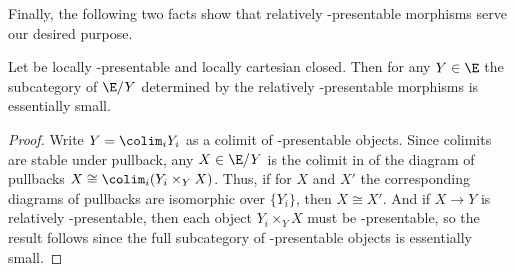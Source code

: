 Finally, the following two facts show that relatively \ka-presentable morphisms serve our desired purpose.

\begin{prop}\label{thm:relpres-small}
  Let \E be locally \ka-presentable and locally cartesian closed.
  Then for any $Y\in\E$ the subcategory of $\E/Y$ determined by the relatively \ka-presentable morphisms is essentially small.
\end{prop}
\begin{proof}
  Write $Y = \colim_i Y_i$ as a colimit of \ka-presentable objects.
  Since colimits are stable under pullback, any $X\in \E/Y$ is the colimit in \E of the diagram of pullbacks $X \cong \colim_i (Y_i\times_Y X)$.
  Thus, if for $X$ and $X'$ the corresponding diagrams of pullbacks are isomorphic over $\{Y_i\}$, then $X\cong X'$.
  And if $X\to Y$ is relatively \ka-presentable, then each object $Y_i \times_Y X$ must be \ka-presentable, so the result follows since the full subcategory of \ka-presentable objects is essentially small.
\end{proof}

